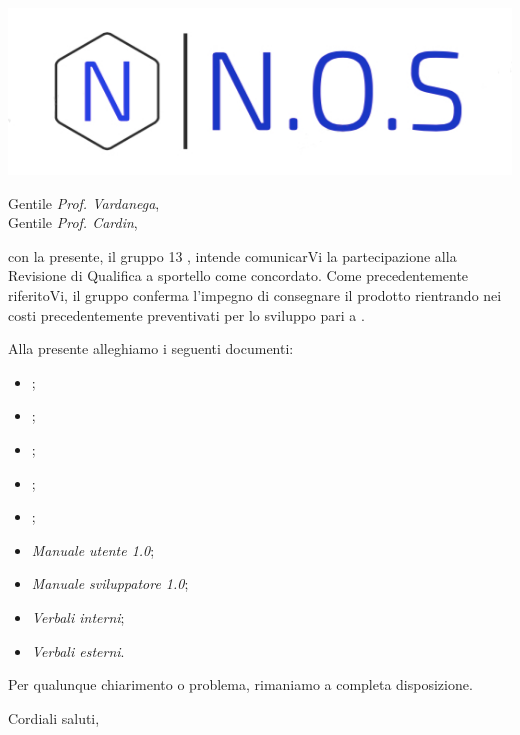 \documentclass[12pt]{letter}
\date{10 aprile 2021}
\begin{document}
\begin{letter}{ }

\includegraphics[scale=1.5
]{../../../Immagini/N.O.S.jpg}

\opening{Gentile \textit{Prof. Vardanega},\\ Gentile \textit{Prof. Cardin}, }

con la presente, il gruppo 13 {\Gruppo}, intende comunicarVi la partecipazione alla Revisione di Qualifica a sportello come concordato.
Come precedentemente riferitoVi, il gruppo conferma l'impegno di consegnare il prodotto rientrando nei costi precedentemente preventivati per lo sviluppo pari a .

Alla presente alleghiamo i seguenti documenti:

\begin{itemize}
	\item {};
	\item {};
	\item {};
	\item {};
	\item {};
	\item \textit{Manuale utente 1.0};
	\item \textit{Manuale sviluppatore 1.0};
	\item \textit{Verbali interni};
	\item \textit{Verbali esterni}.
\end{itemize}

Per qualunque chiarimento o problema, rimaniamo a completa disposizione.

\closing{Cordiali saluti, }

\vspace{2em}

\end{letter}
\end{document}
